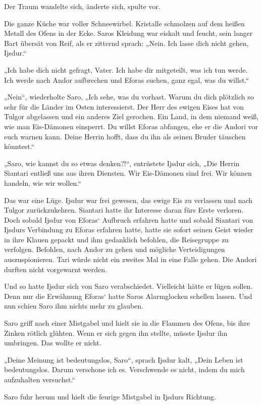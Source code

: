 Der Traum wandelte sich, änderte sich, spulte vor.



Die ganze Küche war voller Schneewirbel. Kristalle schmolzen auf dem heißen Metall des Ofens in der Ecke. Saros Kleidung war eiskalt und feucht, sein langer Bart übersät von Reif, als er zitternd sprach: „Nein. Ich lasse dich nicht gehen, Ijsdur.“

„Ich habe dich nicht gefragt, Vater. Ich habe dir mitgeteilt, was ich tun werde. Ich werde nach Andor aufbrechen und Eforas suchen, ganz egal, was du willst.“

„Nein“, wiederholte Saro, „Ich sehe, was du vorhast. Warum du dich plötzlich so sehr für die Länder im Osten interessierst. Der Herr des ewigen Eises hat von Tulgor abgelassen und ein anderes Ziel gerochen. Ein Land, in dem niemand weiß, wie man Eis-Dämonen einsperrt. Du willst Eforas abfangen, ehe er die Andori vor euch warnen kann. Deine Herrin hofft, dass du ihn als seinen Bruder täuschen könntest.“

„Saro, wie kannst du so etwas denken?!“, entrüstete Ijsdur sich, „Die Herrin Siantari entließ uns aus ihren Diensten. Wir Eis-Dämonen sind frei. Wir können handeln, wie wir wollen.“

Das war eine Lüge. Ijsdur war frei gewesen, das ewige Eis zu verlassen und nach Tulgor zurückzukehren. Siantari hatte ihr Interesse daran fürs Erste verloren. Doch sobald Ijsdur von Eforas‘ Aufbruch erfahren hatte und sobald Siantari von Ijsdurs Verbindung zu Eforas erfahren hatte, hatte sie sofort seinen Geist wieder in ihre Klauen gepackt und ihm gedanklich befohlen, die Reisegruppe zu verfolgen. Befohlen, nach Andor zu gehen und mögliche Verteidigungen auszuspionieren. Tari würde nicht ein zweites Mal in eine Falle gehen. Die Andori durften nicht vorgewarnt werden.

Und so hatte Ijsdur sich von Saro verabschiedet. Vielleicht hätte er lügen sollen. Denn nur die Erwähnung Eforas‘ hatte Saros Alarmglocken schellen lassen. Und nun schien Saro ihm nichts mehr zu glauben.

Saro griff nach einer Mistgabel und hielt sie in die Flammen des Ofens, bis ihre Zinken rötlich glühten. Wenn er sich gegen ihn stellte, müsste Ijsdur ihn umbringen. Das wollte er nicht.

„Deine Meinung ist bedeutungslos, Saro“, sprach Ijsdur kalt, „Dein Leben ist bedeutungslos. Darum verschone ich es. Verschwende es nicht, indem du mich aufzuhalten versuchst.“

Saro fuhr herum und hielt die feurige Mistgabel in Ijsdurs Richtung.

